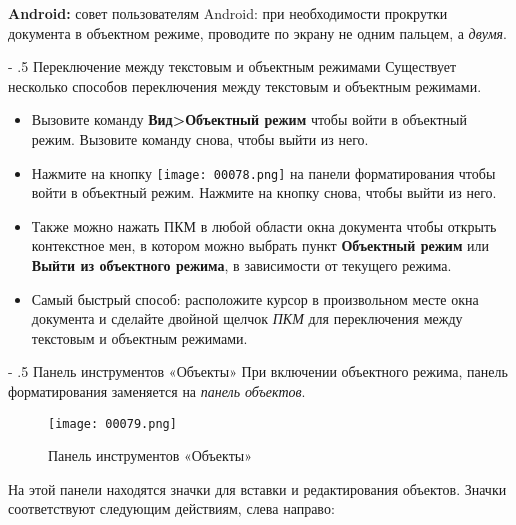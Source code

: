 \documentclass[a4paper,10pt]{article}
\makeatletter
\renewcommand\paragraph{%
   \@startsection{paragraph}{4}{0mm}%
      {-\baselineskip}%
      {.5\baselineskip}%
      {\normalfont\normalsize\bfseries}}
\makeatother
\begin{document}
\textbf{Android:} совет пользователям Android: при необходимости прокрутки документа в объектном режиме, проводите по экрану не одним пальцем, а \textit{двумя}.

\paragraph{Переключение между текстовым и объектным режимами}
Существует несколько способов переключения между текстовым и объектным режимами.

\begin{itemize}
 \item Вызовите команду \textbf{Вид>Объектный режим} чтобы войти в объектный режим. Вызовите команду снова, чтобы выйти из него.
 \item Нажмите на кнопку \texttt{[image: 00078.png]} на панели форматирования чтобы войти в объектный режим. Нажмите на кнопку снова, чтобы выйти из него.
 \item Также можно нажать ПКМ в любой области окна документа чтобы открыть контекстное мен, в котором можно выбрать пункт \textbf{Объектный режим} или \textbf{Выйти из объектного режима}, в зависимости от текущего режима.
 \item Самый быстрый способ: расположите курсор в произвольном месте окна документа и сделайте двойной щелчок \textit{ПКМ} для переключения между текстовым и объектным режимами.
\end{itemize}

\paragraph{Панель инструментов «Объекты»}
При включении объектного режима, панель форматирования заменяется на \textit{панель объектов}.

\begin{figure}[ht]
\texttt{[image: 00079.png]}
\centering
\caption{Панель инструментов «Объекты»}
\end{figure}

На этой панели находятся значки для вставки и редактирования объектов. Значки соответствуют следующим действиям, слева направо:
\end{document}
